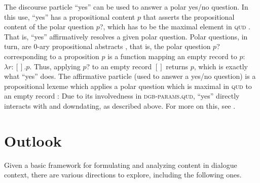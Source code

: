 \documentclass[output=paper,biblatex,babelshorthands,newtxmath,draftmode,colorlinks,citecolor=brown]{langscibook}
\begin{document}
The discourse particle \enquote{yes} can be used to answer a polar yes/no question.
%
In this use, \enquote{yes} has a propositional content $p$ that asserts the propositional content of the polar question $p$?, which has to be the maximal element in \textsc{qud} \citep[Chapter~2,  \textit{et seq.}]{Ginzburg:2012}.
%
That is, \enquote{yes} affirmatively resolves a given polar question.
%
Polar questions, in turn, are 0-ary propositional abstracts \citep[]{Ginzburg:2012}, that is, the polar question $p$? corresponding to a proposition $p$ is a function mapping an empty record to $p$: $\lambda r : [] . p$.
%
Thus, applying $p$? to an empty record $[]$ returns $p$, which is exactly what \enquote{yes} does.
%
The affirmative particle (used to answer a yes/no question) is a propositional lexeme which applies a polar question which is maximal in \textsc{qud} to an empty record \citep[cf.][]{Ginzburg:2012}:
%
\ea
\z 
%
Due to its involvedness in \textsc{dgb-params.qud}, \enquote{yes} directly interacts with  and downdating, as described above.
%
For more on this, see \citet{Ginzburg:2012}.



\section{Outlook}
\label{sec:outlook-dialogue}

Given a basic framework for formulating and analyzing content in dialogue context, there are various directions to explore, including the following ones.
\end{document}
